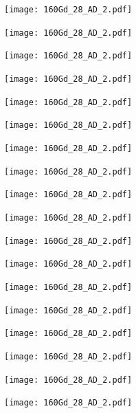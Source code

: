 \begin{center}
\texttt{[image: 160Gd\_28\_AD\_2.pdf]}
\end{center}
\begin{center}
\texttt{[image: 160Gd\_28\_AD\_2.pdf]}
\end{center}
\begin{center}
\texttt{[image: 160Gd\_28\_AD\_2.pdf]}
\end{center}
\begin{center}
\texttt{[image: 160Gd\_28\_AD\_2.pdf]}
\end{center}
\begin{center}
\texttt{[image: 160Gd\_28\_AD\_2.pdf]}
\end{center}
\begin{center}
\texttt{[image: 160Gd\_28\_AD\_2.pdf]}
\end{center}
\begin{center}
\texttt{[image: 160Gd\_28\_AD\_2.pdf]}
\end{center}
\begin{center}
\texttt{[image: 160Gd\_28\_AD\_2.pdf]}
\end{center}
\begin{center}
\texttt{[image: 160Gd\_28\_AD\_2.pdf]}
\end{center}
\begin{center}
\texttt{[image: 160Gd\_28\_AD\_2.pdf]}
\end{center}
\begin{center}
\texttt{[image: 160Gd\_28\_AD\_2.pdf]}
\end{center}
\begin{center}
\texttt{[image: 160Gd\_28\_AD\_2.pdf]}
\end{center}
\begin{center}
\texttt{[image: 160Gd\_28\_AD\_2.pdf]}
\end{center}
\begin{center}
\texttt{[image: 160Gd\_28\_AD\_2.pdf]}
\end{center}
\begin{center}
\texttt{[image: 160Gd\_28\_AD\_2.pdf]}
\end{center}
\begin{center}
\texttt{[image: 160Gd\_28\_AD\_2.pdf]}
\end{center}
\begin{center}
\texttt{[image: 160Gd\_28\_AD\_2.pdf]}
\end{center}
\begin{center}
\texttt{[image: 160Gd\_28\_AD\_2.pdf]}
\end{center}
